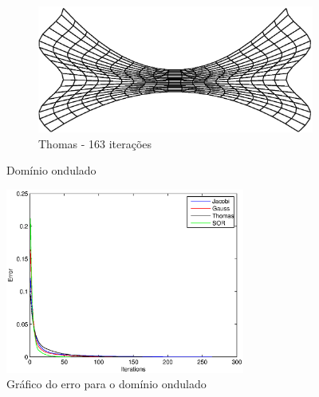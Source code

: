 \documentclass{article}
\begin{document}
\begin{figure}
			\begin{subfigure}[b]{0.45\textwidth}
				\centering
				\includegraphics[width=\textwidth]{figures/waves-thomas.eps}
				\caption{Thomas - 163 iterações}
			\end{subfigure}
			\caption{Domínio ondulado}
			\label{fig:ondas}
			\centering
			\includegraphics[width=0.7\textwidth]{figures/waves-error.eps}
			\caption{Gráfico do erro para o domínio ondulado}
			\label{fig:ondas:erro}
		\end{figure}
\end{document}
